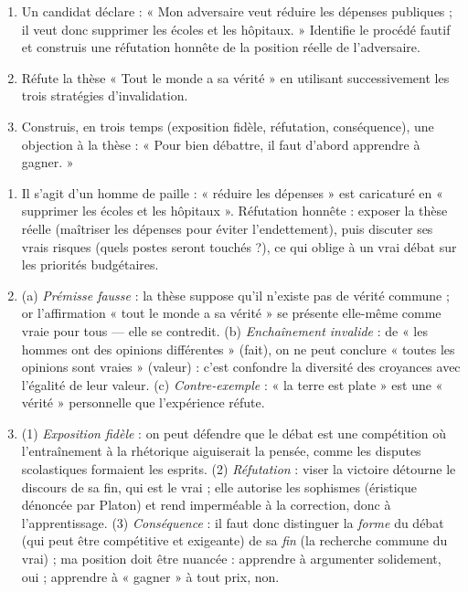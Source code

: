 \documentclass[11pt]{article}
\newcommand{\cle}[1]{{\popxbold\color{popdark}#1}}
\begin{document}
\begin{exercice}
\begin{enumerate}
\item Un candidat déclare : « Mon adversaire veut réduire les dépenses publiques ; il veut donc supprimer les écoles et les hôpitaux. » Identifie le procédé fautif et construis une réfutation honnête de la position réelle de l'adversaire.
\item Réfute la thèse « Tout le monde a sa vérité » en utilisant successivement les trois stratégies d'invalidation.
\item Construis, en trois temps (exposition fidèle, réfutation, conséquence), une objection à la thèse : « Pour bien débattre, il faut d'abord apprendre à gagner. »
\end{enumerate}
\end{exercice}

\begin{corrige}[Exercice]
\begin{enumerate}
\item Il s'agit d'un \cle{homme de paille} : « réduire les dépenses » est caricaturé en « supprimer les écoles et les hôpitaux ». Réfutation honnête : exposer la thèse réelle (maîtriser les dépenses pour éviter l'endettement), puis discuter ses vrais risques (quels postes seront touchés ?), ce qui oblige à un vrai débat sur les priorités budgétaires.
\item (a) \emph{Prémisse fausse} : la thèse suppose qu'il n'existe pas de vérité commune ; or l'affirmation « tout le monde a sa vérité » se présente elle-même comme vraie pour tous — elle se contredit. (b) \emph{Enchaînement invalide} : de « les hommes ont des opinions différentes » (fait), on ne peut conclure « toutes les opinions sont vraies » (valeur) : c'est confondre la diversité des croyances avec l'égalité de leur valeur. (c) \emph{Contre-exemple} : « la terre est plate » est une « vérité » personnelle que l'expérience réfute.
\item (1) \emph{Exposition fidèle} : on peut défendre que le débat est une compétition où l'entraînement à la rhétorique aiguiserait la pensée, comme les disputes scolastiques formaient les esprits. (2) \emph{Réfutation} : viser la victoire détourne le discours de sa fin, qui est le vrai ; elle autorise les sophismes (éristique dénoncée par Platon) et rend imperméable à la correction, donc à l'apprentissage. (3) \emph{Conséquence} : il faut donc distinguer la \emph{forme} du débat (qui peut être compétitive et exigeante) de sa \emph{fin} (la recherche commune du vrai) ; ma position doit être nuancée : apprendre à argumenter solidement, oui ; apprendre à « gagner » à tout prix, non.
\end{enumerate}
\end{corrige}
\end{document}
